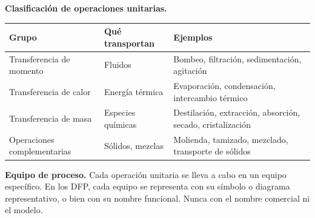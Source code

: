 \textbf{Clasificación de operaciones unitarias.}

\begin{center}
\renewcommand{\arraystretch}{1.4}
\begin{tabular}{|L{3.5cm}|L{4cm}|L{5cm}|}
\hline
\textbf{Grupo} & \textbf{Qué transportan} & \textbf{Ejemplos} \\
\hline
Transferencia de momento & Fluidos & Bombeo, filtración,
sedimentación, agitación \\
\hline
Transferencia de calor & Energía térmica & Evaporación,
condensación, intercambio térmico \\
\hline
Transferencia de masa & Especies químicas & Destilación,
extracción, absorción, secado, cristalización \\
\hline
Operaciones complementarias & Sólidos, mezclas & Molienda,
tamizado, mezclado, transporte de sólidos \\
\hline
\end{tabular}
\end{center}

\textbf{Equipo de proceso.} Cada operación unitaria se lleva a cabo en
un equipo específico. En los DFP, cada equipo se representa con su
símbolo o diagrama representativo, o bien con su nombre funcional.
Nunca con el nombre comercial ni el modelo.

